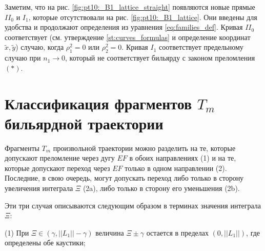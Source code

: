 
\begin{remark}
Заметим, что на рис. \ref{fig:pt10:_B1_lattice_straight} появляются новые прямые $II_0$ и $I_1$, которые отсутствовали на рис. \ref{fig:pt10:_B1_lattice}. Они введены для удобства и продолжают определения из уравнения \eqref{eq:families_def}. Кривая $II_0$ соответствует (см. утверждение \ref{st:curves_formulas} и определение координат $\widetilde{x}, \widetilde{y}$) случаю, когда $\rho_1^2 = 0$ или $\rho_2^2 = 0$. Кривая $I_1$ соответствует предельному случаю при $n_1 \to 0$, который не соответствует бильярду с законом преломления $(\ast)$.
\end{remark}

\section{Классификация фрагментов  $T_m$ бильярдной траектории}
Фрагменты  $T_m$ произвольной траектории можно разделить на те, которые допускают преломление через дугу $EF$ в обоих направлениях (1) и на те, которые допускают переход через $EF$ только в одном направлении  (2). Последние, в свою очередь, могут допускать переход либо только в сторону увеличения интеграла $\Xi$ (2a), либо только в сторону его уменьшения (2b).

Эти три случая описываются следующим образом в терминах значения интеграла $\Xi$:

(1) При $\Xi \in (\gamma, ||L_1|| - \gamma)$ величина $\Xi \pm \gamma$ остается в пределах $(0, ||L_1||)$, где определены обе каустики;

